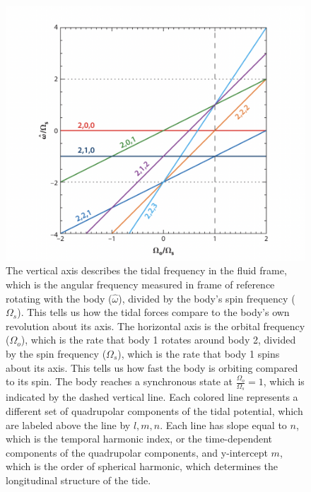 \documentclass[oneside,12pt]{amsart}
\numberwithin{page}{section}
\begin{document}

\begin{figure}[htbp]
    \centering
    \includegraphics[width=0.8\linewidth]{figs/ogilvie_fig2.png}
    \caption{The vertical axis describes the tidal frequency in the fluid frame, which is the angular frequency measured in frame of reference rotating with the body ($\hat{\omega}$), divided by the body's spin frequency ($\Omega_s$). This tells us how the tidal forces compare to the body's own revolution about its axis. The horizontal axis is the orbital frequency ($\Omega_o$), which is the rate that body 1 rotates around body 2, divided by the spin frequency ($\Omega_s$), which is the rate that body 1 spins about its axis. This tells us how fast the body is orbiting compared to its spin. The body reaches a synchronous state at $\frac{\Omega_o}{\Omega_s} = 1$, which is indicated by the dashed vertical line. 
    Each colored line represents a different set of quadrupolar components of the tidal potential, which are labeled above the line by $l, m, n$.
    Each line has slope equal to $n$, which is the temporal harmonic index, or the time-dependent components of the quadrupolar components, and y-intercept $m$, which is the order of spherical harmonic, which determines the longitudinal structure of the tide. }
    \label{fig:ogilvie-fig2}
\end{figure}
\end{document}

